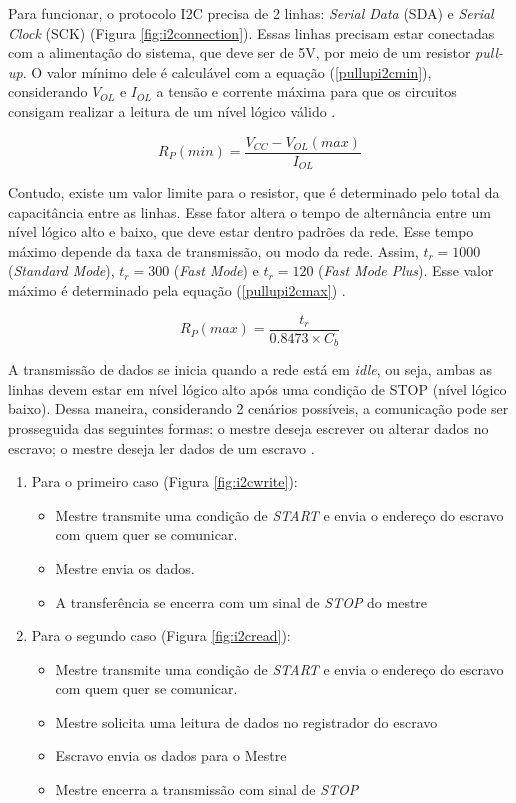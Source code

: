 Para funcionar, o protocolo I2C precisa de 2 linhas: \textit{Serial Data} (SDA) e \textit{Serial Clock} (SCK) (Figura \ref{fig:i2connection}). Essas linhas precisam estar conectadas com a alimentação do sistema, que deve ser de 5V, por meio de um resistor \textit{pull-up}. O valor mínimo dele é calculável com a equação (\ref{pullupi2cmin}), considerando $ V_{OL} $ e $ I_{OL} $ a tensão e corrente máxima para que os circuitos consigam realizar a leitura de um nível lógico válido \cite{man:texasI2Cpullup}. 

\begin{equation}
	R_P(min) = \dfrac{ V_{CC} - V_{OL}(max) }{I_{OL}}
	\label{pullupi2cmin}
\end{equation}

Contudo, existe um valor limite para o resistor, que é determinado pelo total da capacitância entre as linhas. Esse fator altera o tempo de alternância entre um nível lógico alto e baixo, que deve estar dentro padrões da rede. Esse tempo máximo depende da taxa de transmissão, ou modo da rede. Assim, $ t_r=1000  $ (\textit{Standard Mode}), $ t_r=300 $ (\textit{Fast Mode}) e $ t_r=120  $ (\textit{Fast Mode Plus}). Esse valor máximo é determinado pela equação (\ref{pullupi2cmax}) \cite{man:texasI2Cpullup}.

\begin{equation}
	R_P(max) = \dfrac{ t_r }{0.8473 \times C_b}
	\label{pullupi2cmax}
\end{equation}

A transmissão de dados se inicia quando a rede está em \textit{idle}, ou seja, ambas as linhas devem estar em nível lógico alto após uma condição de STOP (nível lógico baixo). Dessa maneira, considerando 2 cenários possíveis, a comunicação pode ser prosseguida das seguintes formas: o mestre deseja escrever ou alterar dados no escravo; o mestre deseja ler dados de um escravo \cite{man:texasI2C}.

\begin{enumerate}
\item Para o primeiro caso (Figura \ref{fig:i2cwrite}):
\begin{itemize}
	\item Mestre transmite uma condição de \textit{START} e envia o endereço do escravo com quem quer se comunicar.
	\item Mestre envia os dados.
	\item A transferência se encerra com um sinal de \textit{STOP} do mestre
\end{itemize}

\item Para o segundo caso  (Figura \ref{fig:i2cread}):
\begin{itemize}
	\item Mestre transmite uma condição de \textit{START} e envia o endereço do escravo com quem quer se comunicar.
	\item Mestre solicita uma leitura de dados no registrador do escravo
	\item Escravo envia os dados para o Mestre
	\item Mestre encerra a transmissão com sinal de \textit{STOP}
\end{itemize}
\end{enumerate}

